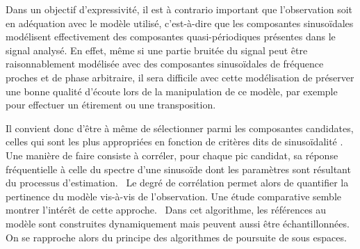 


Dans un objectif d'expressivité, il est à contrario important que l'observation  soit en adéquation avec le modèle utilisé, c'est-à-dire que les composantes sinusoïdales modélisent effectivement des composantes quasi-périodiques présentes dans le signal analysé. En effet, même si une partie bruitée du signal peut être raisonnablement modélisée avec des composantes sinusoïdales de fréquence proches et de phase arbitraire, il sera difficile avec cette modélisation de préserver une bonne qualité d'écoute lors de la manipulation de ce modèle, par exemple pour effectuer un étirement ou une transposition.

Il convient donc d'être à même de sélectionner parmi les composantes candidates, celles qui sont les plus appropriées en fonction de critères dits de \og sinusoïdalité \fg. Une manière de faire consiste à corréler, pour chaque pic candidat, sa réponse fréquentielle à celle du spectre d'une sinusoïde dont les paramètres sont résultant du processus d'estimation.~\cite{peak-selection} Le degré de corrélation permet alors de quantifier la pertinence du modèle vis-à-vis de l'observation. Une étude comparative semble montrer l'intérêt de cette approche.~\cite{wells2010comparative} Dans cet algorithme, les références au modèle sont construites dynamiquement mais peuvent aussi être échantillonnées. On se rapproche alors du principe des algorithmes de poursuite de sous espaces.

